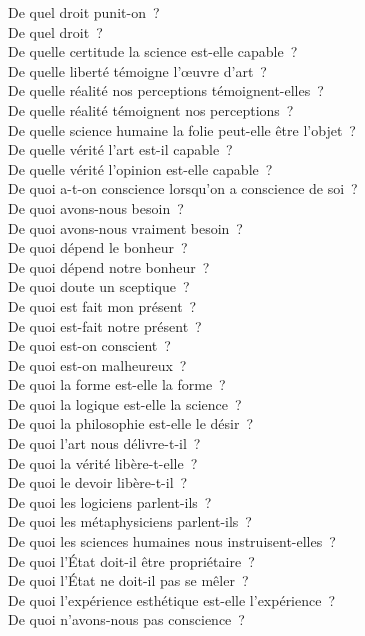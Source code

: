 \documentclass[a4paper,12pt]{article}
\begin{document}
De quel droit punit-on ? \\
De quel droit ? \\
De quelle certitude la science est-elle capable ? \\
De quelle liberté témoigne l'œuvre d'art ? \\
De quelle réalité nos perceptions témoignent-elles ? \\
De quelle réalité témoignent nos perceptions ? \\
De quelle science humaine la folie peut-elle être l'objet ? \\
De quelle vérité l'art est-il capable ? \\
De quelle vérité l'opinion est-elle capable ? \\
De quoi a-t-on conscience lorsqu'on a conscience de soi ? \\
De quoi avons-nous besoin ? \\
De quoi avons-nous vraiment besoin ? \\
De quoi dépend le bonheur ? \\
De quoi dépend notre bonheur ? \\
De quoi doute un sceptique ? \\
De quoi est fait mon présent ? \\
De quoi est-fait notre présent ? \\
De quoi est-on conscient ? \\
De quoi est-on malheureux ? \\
De quoi la forme est-elle la forme ? \\
De quoi la logique est-elle la science ? \\
De quoi la philosophie est-elle le désir ? \\
De quoi l'art nous délivre-t-il ? \\
De quoi la vérité libère-t-elle ? \\
De quoi le devoir libère-t-il ? \\
De quoi les logiciens parlent-ils ? \\
De quoi les métaphysiciens parlent-ils ? \\
De quoi les sciences humaines nous instruisent-elles ? \\
De quoi l'État doit-il être propriétaire ? \\
De quoi l'État ne doit-il pas se mêler ? \\
De quoi l'expérience esthétique est-elle l'expérience ? \\
De quoi n'avons-nous pas conscience ? \\
\end{document}
